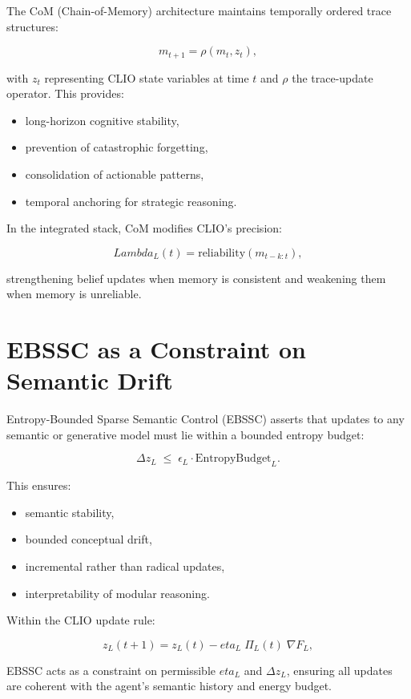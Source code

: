 \documentclass[12pt,oneside]{book}
\theoremstyle{plain}
\theoremstyle{definition}
\def\eta{eta}%
\def\Lambda{Lambda}%
\begin{document}
The CoM (Chain-of-Memory) architecture maintains temporally ordered trace
structures:

\[
m_{t+1} = \rho(m_t, z_t),
\]

with $z_t$ representing CLIO state variables at time $t$ and $\rho$ the
trace-update operator.
This provides:

\begin{itemize}
    \item long-horizon cognitive stability,
    \item prevention of catastrophic forgetting,
    \item consolidation of actionable patterns,
    \item temporal anchoring for strategic reasoning.
\end{itemize}

In the integrated stack, CoM modifies CLIO’s precision:

\[
\Lambda_L(t) = \mathrm{reliability}\!\left( m_{t-k:t} \right),
\]

strengthening belief updates when memory is consistent and weakening them
when memory is unreliable.

\section{EBSSC as a Constraint on Semantic Drift}

Entropy-Bounded Sparse Semantic Control (EBSSC) asserts that updates to any
semantic or generative model must lie within a bounded entropy budget:

\[
\Delta z_L \;\leq\; \epsilon_L \cdot
\mathrm{EntropyBudget}_L.
\]

This ensures:

\begin{itemize}
    \item semantic stability,
    \item bounded conceptual drift,
    \item incremental rather than radical updates,
    \item interpretability of modular reasoning.
\end{itemize}

Within the CLIO update rule:

\[
z_L(t+1)
=
z_L(t)
-
\eta_L\;
\Pi_L(t)\;
\nabla F_L,
\]

EBSSC acts as a constraint on permissible $\eta_L$ and $\Delta z_L$, ensuring
all updates are coherent with the agent’s semantic history and energy budget.
\end{document}
